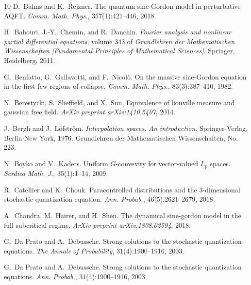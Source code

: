\documentclass[a4paper,10pt]{article}
\newcommand{\tmtextit}[1]{{\itshape{#1}}}
\begin{document}
\begin{thebibliography}{10}
  D.~Bahns  and  K.~Rejzner. {\newblock}The quantum
  sine-Gordon model in perturbative AQFT. {\newblock}\tmtextit{Comm. Math.
  Phys.}, 357(1):421--446, 2018.{\newblock}
  
  H.~Bahouri, J.-Y.~Chemin, and  R.~Danchin.
  {\newblock}\tmtextit{Fourier analysis and nonlinear partial differential
  equations},  volume  343  of \tmtextit{Grundlehren der Mathematischen
  Wissenschaften [Fundamental Principles of Mathematical Sciences]}.
  {\newblock}Springer, Heidelberg, 2011.{\newblock}
  
  G.~Benfatto, G.~Gallavotti, and  F.~Nicol{\`o}.
  {\newblock}On the massive sine-Gordon equation in the first few regions of
  collapse. {\newblock}\tmtextit{Comm. Math. Phys.}, 83(3):387--410,
  1982.{\newblock}
  
  N.~Berestycki, S.~Sheffield, and  X.~Sun.
  {\newblock}Equivalence of liouville measure and gaussian free field.
  {\newblock}\tmtextit{ArXiv preprint arXiv:1410.5407}, 2014.{\newblock}
  
  J.~Bergh  and  J.~L{\"o}fstr{\"o}m.
  {\newblock}\tmtextit{Interpolation spaces. An introduction}.
  {\newblock}Springer-Verlag, Berlin-New York, 1976. {\newblock}Grundlehren
  der Mathematischen Wissenschaften, No. 223.{\newblock}
  
  N.~Boyko  and  V.~Kadets. {\newblock}Uniform
  $G$-convexity for vector-valued $L_p$ spaces. {\newblock}\tmtextit{Serdica
  Math. J.}, 35(1):1--14, 2009.{\newblock}
  
  R.~Catellier  and  K.~Chouk. {\newblock}Paracontrolled
  distributions and the 3-dimensional stochastic quantization equation.
  {\newblock}\tmtextit{Ann. Probab.}, 46(5):2621--2679, 2018.{\newblock}
  
  A.~Chandra, M.~Hairer, and  H.~Shen. {\newblock}The
  dynamical sine-gordon model in the full subcritical regime.
  {\newblock}\tmtextit{ArXiv preprint arXiv:1808.02594}, 2018.{\newblock}
  
  G.~Da Prato  and  A.~Debussche.
  {\newblock}Strong solutions to the stochastic quantization equations.
  {\newblock}\tmtextit{The Annals of Probability}, 31(4):1900--1916,
  2003.{\newblock}
  
  G.~Da Prato  and  A.~Debussche. {\newblock}Strong
  solutions to the stochastic quantization equations.
  {\newblock}\tmtextit{Ann. Probab.}, 31(4):1900--1916, 2003.{\newblock}
  

\end{thebibliography}
\end{document}
